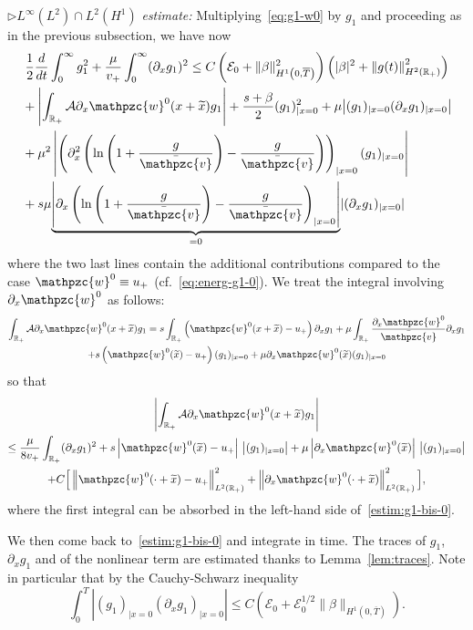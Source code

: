 \documentclass[AHL,Unicode,longabstracts,published]{cedram}
\newcommand{\R}{\mathbb{R}}
\newcommand{\p}{\partial}
\newcommand{\bv}{\bar{\mathpzc{v}}}
\newcommand{\cA}{\mathcal A}
\newcommand{\cE}{\mathcal E}
\newcommand{\tw}{\mathpzc{w}}
\newcommand{\tx}{\widetilde{x}}
\newcommand{\tx}{\widetilde{x}}
\begin{document}
$\rhd L^{\infty}(L^2)\cap L^2(H^1)$ \emph{estimate:} Multiplying~\eqref{eq:g1-w0} by $g_1$ and proceeding as in the previous subsection, we have now
\begin{multline}\label{estim:g1-bis-0}
\frac{1}{2}\frac{d}{dt}\int_0^\infty g_1^2 + \frac{\mu}{v_+}\int_0^\infty (\p_x g_1)^2 \leq C\left(\cE_0 + \|\beta\|_{H^1\left(0, \overline{T}\right)}^2\right)\left(|\beta|^2 + \left\| g(t) \right\|_{H^2(\R_+)}^2\right)\\
\begin{aligned}
& + \left|\int_{\R_+} \cA \partial_x \tw^0(x+ \tx) g_1 \right| + \dfrac{s+ \beta}{2} (g_1)_{|x=0}^2 + \mu \big|(g_1)_{|x=0}(\partial_x g_1)_{|x=0} \big| \\
& +\mu^2 \left|\left(\partial^2_x\left(\ln\left(1+ \frac{g}{\bv}\right) -\frac{g}{\bv} \right)\right)_{|x=0} (g_1)_{|x=0} \right|\\
&+ s\mu \underset{=0}{\underbrace{\left| \partial_x \left(\ln \left(1+ \frac{g}{\bv}\right) -\frac{g}{\bv} \right)_{|x=0}\right|}} |(\partial_x g_1)_{|x=0}|
\end{aligned}
\end{multline}
where the two last lines contain the additional contributions compared to the case $\tw^0 \equiv u_+$ (cf.~\eqref{eq:energ-g1-0}). We treat the integral involving $\partial_x \tw^0$ as follows:
\begin{multline*}
\int_{\R_+} \cA \partial_x \tw^0(x+ \tx) g_1  = s \int_{\R_+} \left(\tw^0(x+\tx) - u_+\right) \partial_x g_1 + \mu \int_{\R_+} \dfrac{\partial_x \tw^0}{\bv} \partial_x g_1 \\
+ s\left(\tw^0(\tx) - u_+\right) (g_1)_{|x=0} + \mu \partial_x \tw^0(\tx) (g_1)_{|x=0}
\end{multline*}
so that
\begin{multline*}
\left|\int_{\R_+} \cA \partial_x \tw^0(x+ \tx) g_1\right|\\
\leq \dfrac{\mu}{8v_+} \int_{\R_+} (\partial_x g_1)^2 + s \left|\tw^0(\tx) - u_+\right|\, \left|(g_1)_{|x=0}\right| + \mu \left|\partial_x \tw^0(\tx)\right|\, \left|(g_1)_{|x=0}\right| \\
 + C \Big[\left\|\tw^0(\cdot+\tx) - u_+\right\|_{L^2(\R_+)}^2 + \left\|\partial_x \tw^0(\cdot+\tx)\right\|_{L^2(\R_+)}^2 \Big],
\end{multline*}
where the first integral can be absorbed in the left-hand side of~\eqref{estim:g1-bis-0}.

We then come back to~\eqref{estim:g1-bis-0} and integrate in time. The traces of $g_1$, $\p_x g_1$ and of the nonlinear term are estimated thanks to Lemma~\ref{lem:traces}. Note in particular that by the Cauchy-Schwarz inequality
\[
\int_0^T \left| (g_1)_{|x=0}(\partial_x g_1)_{|x=0}\right| \leq {C \left(\cE_0 + \cE_0^{1/2} \|\beta\|_{H^1(0, \overline{T})}\right)}.
\]
\end{document}
